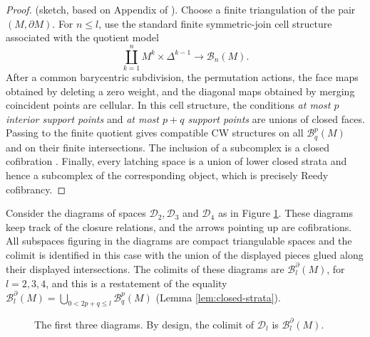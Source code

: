 \documentclass[11pt,a4paper]{article}
\numberwithin{equation}{section}
\theoremstyle{definition}
\theoremstyle{remark}
\newcommand{\pa}{\partial}
\newcommand{\BB}{\mathcal B}
\begin{document}
\begin{proof}
(sketch, based on Appendix of \cite{malchiodi}). Choose a finite triangulation of the pair \((M,\pa M)\). For \(n\le l\), use
the standard finite symmetric-join cell structure associated with the quotient model
\[
\coprod_{k=1}^{n}M^k\times\Delta^{k-1}\longrightarrow\BB_n(M).
\]
After a common barycentric subdivision, the permutation actions, the face
maps obtained by deleting a zero weight, and the diagonal maps obtained by
merging coincident points are cellular. In this cell structure, the conditions
\emph{at most \(p\) interior support points} and \emph{at most \(p+q\) support
points} are unions of closed faces. Passing to the finite quotient gives
compatible CW structures on all \(\BB_q^p(M)\) and on their finite
intersections. The inclusion of a subcomplex is a closed
cofibration \cite[Chapter~5]{Strom2011}.
Finally, every latching space is a union of lower closed strata and hence a
subcomplex of the corresponding object, which is precisely Reedy
cofibrancy.
\end{proof}

Consider the  diagrams of spaces $\mathcal D_2,\mathcal D_3$ and $\mathcal D_4$ as in Figure \ref{fig:low-order-diagrams}. These diagrams keep track of the closure relations, and the arrows pointing up are cofibrations. All subspaces figuring in the diagrams are compact triangulable spaces %
and the colimit is identified in this case with the union of the displayed pieces glued along their displayed intersections. The colimits of these diagrams are $\BB_l^\pa (M)$, for $l=2,3,4$, and this is a restatement of the equality $\displaystyle
\BB_l^{\pa}(M)=\bigcup_{0<2p+q\le l}\BB_q^p(M)$ (Lemma \ref{lem:closed-strata}).

\begin{figure}[htbp]
\centering
{}
\caption{The first three diagrams. By design, the colimit of
$\mathcal D_l$ is $\BB_l^\partial(M)$.}
\label{fig:low-order-diagrams}
\end{figure}
\end{document}
